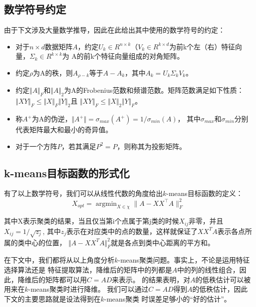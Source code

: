 \documentclass{ctexart}
\begin{document}
    \subsection{数学符号约定}
    由于下文涉及大量数学推导，因此在此给出其中使用的数学符号的约定：
    \begin{itemize}
        \item 对于$n \times d$数据矩阵$A$，约定$U_k \in R^{n \times k}$（$V_k \in R^{k \times d}$为前k个左（右）特征向量，$\Sigma_k \in R^{k \times k}$为
            A的前k个特征向量组成的对角矩阵。
        \item 约定$\rho$为A的秩，则$A_{\rho - k}$等于$A-A_k$，其中$A_k=U_k \Sigma_k V_k$。
        \item 约定$\Vert A \Vert_F$和$\Vert A \Vert_2$为A的Frobenius范数和频谱范数。矩阵范数满足如下性质：$\Vert XY \Vert_F \leq \Vert X \Vert_F \Vert Y \Vert_2$且
            $\Vert XY \Vert_F \leq \Vert X \Vert_2 \Vert Y \Vert_F$。
        \item 称$A^+$为A的伪逆，$\Vert A^+ \Vert = \sigma_{max}(A^+)=1/\sigma_{min}(A)$，
            其中$\sigma_{max}$和$\sigma_{min}$分别代表矩阵最大和最小的奇异值。
        \item 对于一个方阵$P$，若其满足$P^2=P$，则称其为投影矩阵。
    \end{itemize}

    \subsection{k-means目标函数的形式化}
    有了以上数学符号，我们可以从线性代数的角度给出$k$-means目标函数的定义：
    \begin{equation*}
        X_{opt} = \mathop{\arg\min}_{X \in \chi} \| A - XX^{\top}A \|_{F}^2 \label{opt}
    \end{equation*}

    其中X表示聚类的结果，当且仅当第i个点属于第j类的时候$X_{ij}$非零，并且$X_{ij}= 1/\sqrt{z_{j}}$, 其中$z_{j}$表示在对应类中的点的数量，这样就保证了$XX^TA$表示各点所属的类中心的位置，
    $\Vert A-XX^TA \Vert_F^2$就是各点到类中心距离的平方和。

    在下文中，我们都将从以上角度分析$k$-means聚类问题。事实上，不论是运用特征选择算法还是
    特征提取算法，降维后的矩阵中的列都是$A$中的列的线性组合，因此，降维后的矩阵都可以用$C=AD$来表示。
    \cite{drineas1999clustering}的结果表明，对$A$的低秩估计可以被用来在$k$-means聚类时进行降维。
    我们可以通过$C=AD$得到$A$的低秩估计，因此下文的主要思路就是设法得到在$k$-means聚类
    时误差足够小的“好的估计”。
\end{document}
